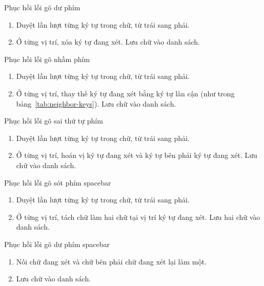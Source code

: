 \documentclass[a4paper,oneside,14pt]{extbook} %
\begin{document}
\begin{algo}\caption{Phục hồi lỗi gõ dư phím}
  \begin{enumerate}
  \item Duyệt lần lượt từng ký tự trong chữ, từ trái sang phải.
  \item Ở từng vị trí, xóa ký tự đang xét. Lưu chữ vào danh sách.
  \end{enumerate}
\end{algo}

\begin{algo}\caption{Phục hồi lỗi gõ nhầm phím}
  \begin{enumerate}
  \item Duyệt lần lượt từng ký tự trong chữ, từ trái sang phải.
  \item Ở từng vị trí, thay thế ký tự đang xét bằng ký tự lân cận (như
    trong bảng~\ref{tab:neighbor-keys}). Lưu chữ vào danh sách.
  \end{enumerate}
\end{algo}

\begin{algo}\caption{Phục hồi lỗi gõ sai thứ tự phím}
  \begin{enumerate}
  \item Duyệt lần lượt từng ký tự trong chữ, từ trái sang phải.
  \item Ở từng vị trí, hoán vị ký tự đang xét và ký tự bên phải ký tự
    đang xét. Lưu chữ vào danh sách.
  \end{enumerate}
\end{algo}

\begin{algo}\caption{Phục hồi lỗi gõ sót phím spacebar}
  \begin{enumerate}
  \item Duyệt lần lượt từng ký tự trong chữ, từ trái sang phải.
  \item Ở từng vị trí, tách chữ làm hai chữ tại vị trí ký tự đang
    xét. Lưu hai chữ vào danh sách.
  \end{enumerate}
\end{algo}

\begin{algo}\caption{Phục hồi lỗi gõ dư phím spacebar}
  \begin{enumerate}
  \item Nối chữ đang xét và chữ bên phải chữ đang xét lại làm một. 
  \item Lưu chữ vào danh sách.
  \end{enumerate}
\end{algo}
\end{document}

